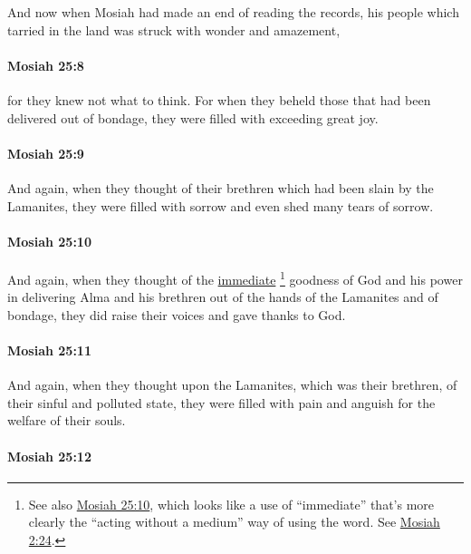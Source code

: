 			And now when Mosiah had made an end of reading the records,
			his people which tarried in the land was struck with wonder and amazement,

		\paragraph{Mosiah 25:8} %
			\label{MOSIAH-25-8}

			for they knew not what to think.
			For when they beheld those that had been delivered out of bondage,
			they were filled with exceeding great joy.

		\paragraph{Mosiah 25:9} %
			\label{MOSIAH-25-9}

			And again, when they thought of their brethren
			which had been slain by the Lamanites,
			they were filled with sorrow and even shed many tears of sorrow.

		\paragraph{Mosiah 25:10} %
			\label{MOSIAH-25-10}

			And again, when they thought of the \hyperref[IMMEDIATE]{immediate}%
				\footnote{%
					See also \hyperref[MOSIAH-25-10]{Mosiah 25:10}, which looks like a use of ``immediate'' that's more clearly the ``acting without a medium'' way of using the word. See \hyperref[MOSIAH-2-24]{Mosiah 2:24}.
					}
			goodness of God
			and his power in delivering Alma and his brethren
			out of the hands of the Lamanites and of bondage,
			they did raise their voices and gave thanks to God.

		\paragraph{Mosiah 25:11} %
			\label{MOSIAH-25-11}

			And again, when they thought upon the Lamanites,
			which was their brethren,
			of their sinful and polluted state,
			they were filled with pain and anguish for the welfare of their souls.

		\paragraph{Mosiah 25:12} %
			\label{MOSIAH-25-12}

